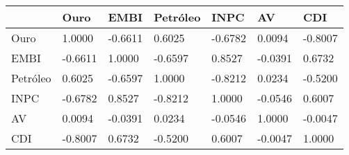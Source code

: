\begin{table}[H]
\centering
\begin{tabular}{P{2.6cm}P{2.6cm}P{2.6cm}P{2.6cm}P{2.6cm}P{2.6cm}} 
  \hline
 & Ouro & EMBI & Petróleo & INPC & AV & CDI \\ 
  \hline
Ouro & 1.0000 & -0.6611 & 0.6025 & -0.6782 & 0.0094 & -0.8007 \\ 
  EMBI & -0.6611 & 1.0000 & -0.6597 & 0.8527 & -0.0391 & 0.6732 \\ 
  Petróleo & 0.6025 & -0.6597 & 1.0000 & -0.8212 & 0.0234 & -0.5200 \\ 
  INPC & -0.6782 & 0.8527 & -0.8212 & 1.0000 & -0.0546 & 0.6007 \\ 
  AV & 0.0094 & -0.0391 & 0.0234 & -0.0546 & 1.0000 & -0.0047 \\ 
  CDI & -0.8007 & 0.6732 & -0.5200 & 0.6007 & -0.0047 & 1.0000 \\ 
   \hline
\end{tabular}
\end{table}
